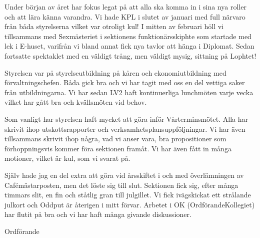 \documentclass[../_main/handlingar.tex]{subfiles}
\begin{document}
Under början av året har fokus legat på att alla ska komma in i sina nya roller och att lära känna varandra. Vi hade KPL i slutet av januari med full närvaro från båda styrelserna vilket var otroligt kul! I mitten av februari höll vi tillsammans med Sexmästeriet i sektionens funktionärsskiphte som startade med lek i E-huset, varifrån vi bland annat fick nya tavlor att hänga i Diplomat. Sedan fortsatte spektaklet med en väldigt trång, men väldigt mysig, sittning på Lophtet!

Styrelsen var på styrelseutbildning på kåren och ekonomiutbildning med förvaltningschefen. Båda gick bra och vi har tagit med oss en del vettiga saker från utbildningarna. Vi har sedan LV2 haft kontinuerliga lunchmöten varje vecka vilket har gått bra och kvällsmöten vid behov.

Som vanligt har styrelsen haft mycket att göra inför Vårterminsmötet. Alla har skrivit ihop utskottsrapporter och verksamhetsplansuppföljningar. Vi har även tillsammans skrivit ihop några, vad vi anser vara, bra propositioner som förhoppningsvis kommer föra sektionen framåt. Vi har även fått in många motioner, vilket är kul, som vi svarat på.

Själv hade jag en del extra att göra vid årsskiftet i och med överlämningen av Cafémästarposten, men det löste sig till slut. Sektionen fick sig, efter många timmars slit, en fin och ståtlig gran till julgillet. Vi fick ivägskickat ett strålande julkort och Oddput är återigen i mitt förvar. Arbetet i OK (OrdförandeKollegiet) har flutit på bra och vi har haft många givande diskussioner.
\begin{signatures}{1}
    \mvh
    \signature{Daniel Bakic}{Ordförande}
\end{signatures}
\end{document}
